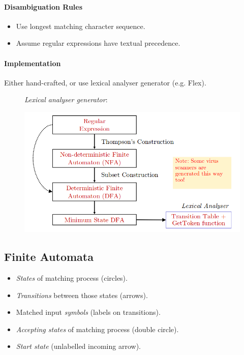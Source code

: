 \documentclass[twocolumn,english]{article}
\begin{document}
\paragraph{Disambiguation Rules}
\begin{itemize}
\item Use longest matching character sequence.
\item Assume regular expressions have textual precedence.
\end{itemize}

\paragraph{Implementation}

Either hand-crafted, or use lexical analyser generator (e.g. Flex).

\begin{figure}[H]
\begin{centering}
\emph{Lexical analyser generator}:
\par\end{centering}
\centering{}\includegraphics[width=0.75\linewidth]{img/lex}
\end{figure}


\subsection{Finite Automata}
\begin{itemize}
\item \emph{States} of matching process (circles).
\item \emph{Transitions} between those states (arrows).
\item Matched input \emph{symbols} (labels on transitions).
\item \emph{Accepting states} of matching process (double circle).
\item \emph{Start state} (unlabelled incoming arrow).
\end{itemize}
\end{document}
